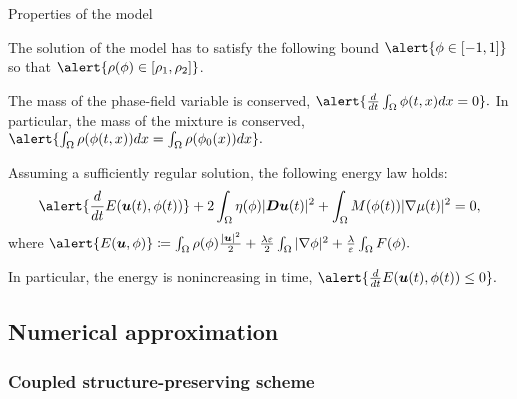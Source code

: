 \begin{frame}{Properties of the model}
  \footnotesize
  \begin{remark}
      The solution of the model has to satisfy the following bound $\alert{\phi\in[-1,1]}$ so that $\alert{\rho(\phi)\in[\rho_1,\rho_2]}$.
  \end{remark}
  \pause

  \begin{proposition}
      The mass of the phase-field variable is conserved, $
      \alert{\frac{d}{dt}\int_\Omega\phi(t,x)dx=0}.
      $
      In particular, the mass of the mixture is conserved, 
       $
      \alert{\int_\Omega \rho(\phi(t,x))dx
      =\int_\Omega \rho(\phi_0(x))dx}.
      $
  \end{proposition}
  \pause

  \begin{proposition}
      Assuming a sufficiently regular solution, the following energy law holds:
      \begin{equation*}
      \alert{\frac{d}{dt} E(\uu(t),\phi(t))}+2\int_\Omega\eta(\phi)\vert\DD\uu(t)\vert^2+\int_\Omega M(\phi(t))\vert\nabla\mu(t)\vert^2=0,
      \end{equation*}
      where
          $\alert{E(\uu,\phi)}\coloneqq\int_\Omega\rho(\phi)\frac{\vert\uu\vert^2}{2}+\frac{\lambda\varepsilon}{2}\int_\Omega\vert\nabla\phi\vert^2+\frac{\lambda}{\varepsilon}\int_\Omega F(\phi).$
      
      \vspace*{0.5em}
      In particular, the energy is nonincreasing in time,
      $
      \alert{\frac{d}{dt} E(\uu(t),\phi(t))\le 0}.
      $
  \end{proposition}
\end{frame}

\subsection{Numerical approximation}

\subsubsection{Coupled structure-preserving scheme}

